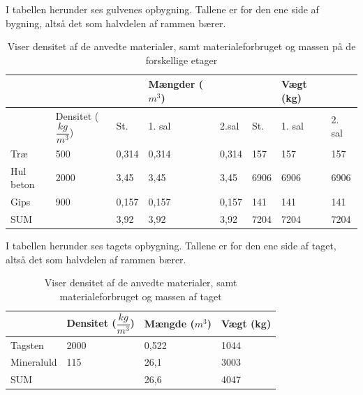 I tabellen herunder ses gulvenes opbygning. Tallene er for den ene side af bygning, altså det som halvdelen af rammen bærer.
\begin{table}[H]
	\centering
	\begin{tabular}{lll|l|ll|l|l}
		\cline{4-4} \cline{7-7}
		&                                                        &       & Mængder ($ m^{3} $) &                            &      & Vægt (kg) &                             \\ \hline
		\multicolumn{1}{|l|}{}          & \multicolumn{1}{l|}{Densitet ($ \dfrac{kg}{m^{3}} $)} & St.   & 1. sal                        & \multicolumn{1}{l|}{2.sal} & St.  & 1. sal    & \multicolumn{1}{l|}{2. sal} \\ \hline
		\multicolumn{1}{|l|}{Træ}       & \multicolumn{1}{l|}{500}                               & 0,314 & 0,314                         & \multicolumn{1}{l|}{0,314} & 157  & 157       & \multicolumn{1}{l|}{157}    \\ \hline
		\multicolumn{1}{|l|}{Hul beton} & \multicolumn{1}{l|}{2000}                              & 3,45  & 3,45                          & \multicolumn{1}{l|}{3,45}  & 6906 & 6906      & \multicolumn{1}{l|}{6906}   \\ \hline
		\multicolumn{1}{|l|}{Gips}      & \multicolumn{1}{l|}{900}                               & 0,157 & 0,157                         & \multicolumn{1}{l|}{0,157} & 141  & 141       & \multicolumn{1}{l|}{141}    \\ \hline
		\multicolumn{1}{|l|}{SUM}       & \multicolumn{1}{l|}{}                                  & 3,92  & 3,92                          & \multicolumn{1}{l|}{3,92}  & 7204 & 7204      & \multicolumn{1}{l|}{7204}   \\ \hline
	\end{tabular}
	\caption{Viser densitet af de anvedte materialer, samt materialeforbruget og massen på de forskellige etager}
	\label{tabel:EL2}
\end{table}

\newpage
I tabellen herunder ses tagets opbygning. Tallene er for den ene side af taget, altså det som halvdelen af rammen bærer.
\begin{table}[H]
	\centering
	\begin{tabular}{l|l|l|l|}
		\cline{2-4}
		& Densitet ($ \dfrac{kg}{m^{3}} $) & Mængde ($ m^{3} $) & Vægt (kg) \\ \hline
		\multicolumn{1}{|l|}{Tagsten}    & 2000                              & 0,522                        & 1044      \\ \hline
		\multicolumn{1}{|l|}{Mineraluld} & 115                               & 26,1                         & 3003      \\ \hline
		\multicolumn{1}{|l|}{SUM}        &                                   & 26,6                         & 4047      \\ \hline
	\end{tabular}
	\caption{Viser densitet af de anvedte materialer, samt materialeforbruget og massen af taget}
	\label{tabel:EL3}
\end{table}

